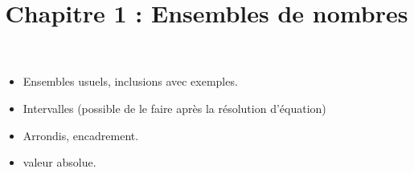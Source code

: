 \documentclass[a4paper,11pt]{article}
\title{Chapitre 1 : Ensembles de nombres}
\date{}
\author{}
\begin{document}
	
\maketitle

\begin{itemize}
	\item Ensembles usuels, inclusions avec exemples.
	\item Intervalles (possible de le faire après la résolution d'équation)
	\item Arrondis, encadrement.
	\item valeur absolue.
\end{itemize}
\end{document}
